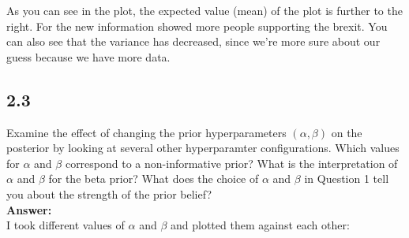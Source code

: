 \documentclass[a4paper]{article}
\begin{document}
As you can see in the plot, the expected value (mean) of the plot is further to the right. For the new information showed more people supporting the brexit. You can also see that the variance has decreased, since we're more sure about our guess because we have more data.

\subsection*{2.3}

Examine the effect of changing the prior hyperparameters $(\alpha, \beta)$ on the posterior by looking at several other hyperparamter configurations. Which values for $\alpha$ and $\beta$ correspond to a non-informative prior? What is the interpretation of $\alpha$ and $\beta$ for the beta prior? What does the choice of $\alpha$ and $\beta$ in Question 1 tell you about the strength of the prior belief?\\


\textbf{Answer:}\\


I took different values of $\alpha$ and $\beta$ and plotted them against each other:
\end{document}

